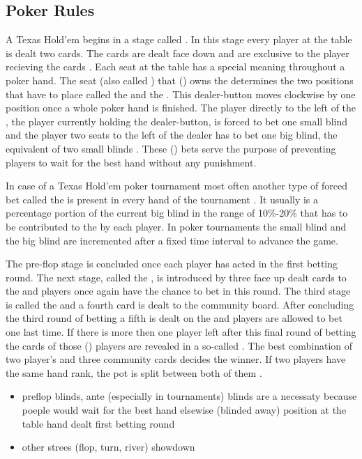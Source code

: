 \subsection{Poker Rules}
A Texas Hold'em  begins in a stage called . In this stage every player at the table is dealt two cards. The cards are dealt face down and are exclusive to the player recieving the cards \cite{billings_phd}. Each seat at the table has a special meaning throughout a poker hand. The seat (also called ) that () owns the  determines the two positions that have to place   called the  and the . This dealer-button moves clockwise by one position once a whole poker hand is finished. The player directly to the left of the , the player currently holding the dealer-button, is forced to bet one small blind and the player two seats to the left of the dealer has to bet one big blind, the equivalent of two small blinds \cite{master_nuno}. These () bets serve the purpose of preventing players to wait for the best hand without any punishment. \par In case of a Texas Hold'em poker tournament most often another type of forced bet called the  is present in every hand of the tournament \cite{poker_dummies}. It usually is a percentage portion of the current big blind in the range of 10\%-20\% that has to be contributed to the  by each player.
In poker tournaments the small blind and the big blind are incremented after a fixed time interval to advance the game.  \par
The pre-flop stage is concluded once each player has acted in the first betting round. The next stage, called the , is introduced by three face up dealt cards to the  and players once again have the chance to bet in this round. The third stage is called the  and a fourth card is dealt to the community board. After concluding the third round of betting a fifth  is dealt on the  and players are allowed to bet one last time. If there is more then one player left after this final round of betting the cards of those () players are revealed in a so-called . The best combination of two player's  and three community cards decides the winner. If two players have the same hand rank, the pot is split between both of them \cite{billings_phd}.
\begin{itemize}
\item preflop
\subitem blinds, ante (especially in tournaments)
\subsubitem blinds are a necessaty because poeple would wait for the best hand elsewise (blinded away)
\subitem position at the table
\subitem hand dealt
\subitem first betting round
\item other strees (flop, turn, river)
\subitem showdown
\end{itemize}

